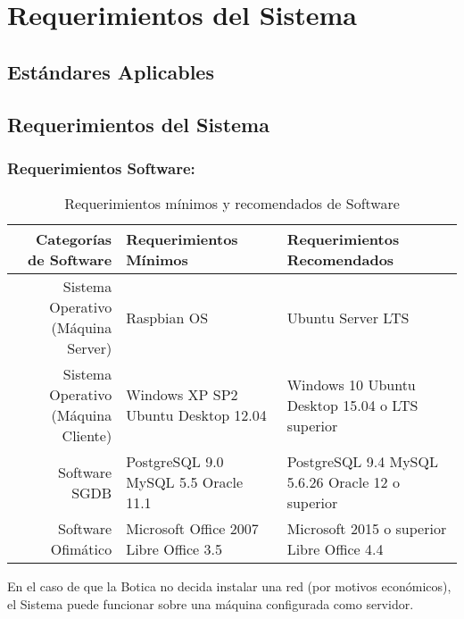 \documentclass[a4paper,11pt, spanish]{report}
\makeatletter
\newcommand{\celda}[3][t]{%
  \begin{tabular}[#1]{@{}#2@{}}#3\end{tabular}}
\makeatother
\begin{document}
{{{{{\section{Requerimientos del Sistema}
   \subsection{Estándares Aplicables}
   \subsection{Requerimientos del Sistema}
        \subsubsection{Requerimientos Software:}
        {\renewcommand{\arraystretch}{1.7}%
        \noindent\begin{table}[H]
        \noindent\begin{tabularx}{\textwidth}{r|X|X}
          \textbf{{\large Categorías de Software}} & \textbf{{\large Requerimientos Mínimos}} & \textbf{{\large Requerimientos Recomendados}} \\
          \hline
         \celda{r}{Sistema Operativo \\ (Máquina Server)} & Raspbian OS  & Ubuntu Server LTS \\ \hline
         \celda{r}{Sistema Operativo \\ (Máquina Cliente)} & Windows XP SP2  \newline Ubuntu Desktop 12.04 & Windows 10 \newline Ubuntu Desktop 15.04 o LTS superior\\ \hline
         Software SGDB & PostgreSQL 9.0 \newline MySQL 5.5 \newline Oracle 11.1 & PostgreSQL 9.4 \newline MySQL 5.6.26 \newline Oracle 12 o superior \\ \hline
         Software Ofimático & Microsoft Office 2007 \newline Libre Office 3.5 & Microsoft 2015 o superior \newline Libre Office 4.4 \\\hline
        \end{tabularx}
        \caption{Requerimientos mínimos y recomendados de Software}
        \end{table}
        En el caso de que la Botica no decida instalar una red (por motivos económicos), el Sistema puede funcionar sobre una máquina configurada como servidor.
}}}}}}
\end{document}
